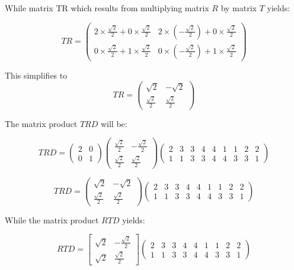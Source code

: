 \documentclass{article}
\begin{document}
While matrix TR which results from multiplying matrix $R$ by matrix $T$ yields:

\[
TR = 
\begin{pmatrix}
2 \times \frac{\sqrt{2}}{2} + 0 \times \frac{\sqrt{2}}{2} & 2 \times (-\frac{\sqrt{2}}{2}) + 0 \times \frac{\sqrt{2}}{2} \\
0 \times \frac{\sqrt{2}}{2} + 1 \times \frac{\sqrt{2}}{2} & 0 \times (-\frac{\sqrt{2}}{2}) + 1 \times \frac{\sqrt{2}}{2}
\end{pmatrix}
\]

This simplifies to
\[
TR = 
\begin{pmatrix}
\sqrt{2} & -\sqrt{2} \\
\frac{\sqrt{2}}{2} & \frac{\sqrt{2}}{2}
\end{pmatrix}
\]

The matrix product $TRD$ will be:

\[
TRD = 
\begin{pmatrix}
2 & 0 \\
0 & 1
\end{pmatrix}
\begin{pmatrix}
\frac{\sqrt{2}}{2} & -\frac{\sqrt{2}}{2} \\
\frac{\sqrt{2}}{2} & \frac{\sqrt{2}}{2}
\end{pmatrix}
\begin{pmatrix}
2 & 3 & 3 & 4 & 4 & 1 & 1 & 2 & 2 \\
1 & 1 & 3 & 3 & 4 & 4 & 3 & 3 & 1
\end{pmatrix}
\]

\[
TRD = 
\begin{pmatrix}
\sqrt{2} & -\sqrt{2} \\
\frac{\sqrt{2}}{2} & \frac{\sqrt{2}}{2}
\end{pmatrix}
\begin{pmatrix}
2 & 3 & 3 & 4 & 4 & 1 & 1 & 2 & 2 \\
1 & 1 & 3 & 3 & 4 & 4 & 3 & 3 & 1
\end{pmatrix}
\]

While the matrix product $RTD$ yields:

\[
  RTD =
\begin{bmatrix}
\sqrt{2} & -\frac{\sqrt{2}}{2} \\
\sqrt{2} & \frac{\sqrt{2}}{2}
\end{bmatrix}
\begin{pmatrix}
2 & 3 & 3 & 4 & 4 & 1 & 1 & 2 & 2 \\
1 & 1 & 3 & 3 & 4 & 4 & 3 & 3 & 1
\end{pmatrix}
\]
\end{document}
